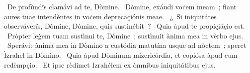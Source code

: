 ~De profùndïs clamávi ad te, Dòmine. 
~Dòmine, exáudi voċem meam~; fiant aures tuae intendèntes in voċem deprecaçiónis meae. 
~¿~Si iniquitátes observáverïs, Dòmine, Dòmine, quìs sustinébit~? 
~Quia àpud te propiçiáçio est. 
~Pròpter leġem tuam sustìnui te, Dòmine~; sustìnuit ànima mea in vèrbo ejus. 
~Sperávit ànima mea in Dòmino a custódia matutína usque ad nòctem~; speret Ìzrahel in Dòmino. 
~Quia àpud Dòminum mizericórdia, et copiósa àpud eum redèmpçio. 
~Et ìpse rèdimet Izrahélem ex òmnibus iniquitátibus ejus. 
